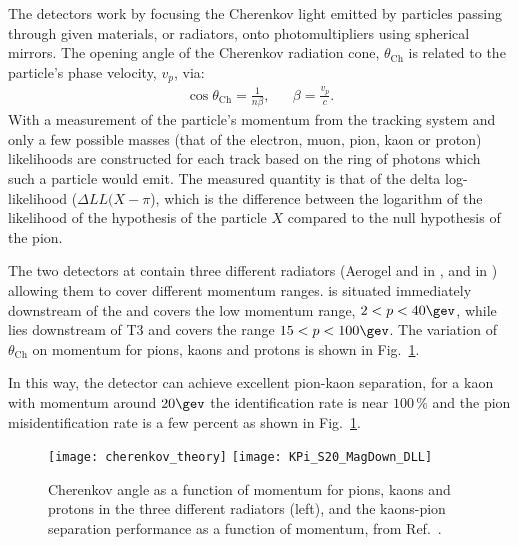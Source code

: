 The \rich detectors work by focusing the Cherenkov light emitted by particles passing through
given materials, or radiators, onto photomultipliers using spherical mirrors.
The opening angle of the Cherenkov radiation cone, $\theta_\mathrm{Ch}$ is related to the
particle's phase velocity, $v_p$, via:
\begin{align}
  \cos\theta_\mathrm{Ch}=\frac1{n\beta}, && \beta=\frac{v_p}{c}.
\end{align}
With a measurement of the particle's momentum from the tracking system and only a few possible
masses (that of the electron, muon, pion, kaon or proton) likelihoods are constructed for each
track based on the ring of photons which such a particle would emit.
The measured quantity is that of the delta log-likelihood ($\Delta LL(X-\pi$), which is the difference between the
logarithm of the likelihood of the hypothesis of the particle $X$ compared to the null hypothesis of the
pion.

The two \rich detectors at \lhcb contain three different radiators (Aerogel and \cfourften in
\richone, and \cffour in \richtwo) allowing them to cover different momentum ranges.
\richone is situated immediately downstream of the \velo and covers the low momentum range,
$2<p<40\gev$, while \richtwo lies downstream of T3 and covers the range $15<p<100\gev$.
The variation of $\theta_\mathrm{Ch}$ on momentum for pions, kaons and protons is shown in
Fig.~\ref{fig:lhcb:pideff}.

In this way, the \lhcb detector can achieve excellent pion-kaon separation, for a kaon with
momentum around $20\gev$ the identification rate is near $100\,\%$ and the pion misidentification
rate is a few percent as shown in Fig.~\ref{fig:lhcb:pideff}.

\begin{figure}
  \begin{center}
    \texttt{[image: cherenkov\_theory]}
    \texttt{[image: KPi\_S20\_MagDown\_DLL]}
  \end{center}
  \caption[Particle identification and Cherenkov angles]
  {\small
    Cherenkov angle as a function of momentum for pions, kaons and protons in the three different
    radiators (left), and the kaons-pion separation performance as a function of momentum, from
    Ref.~\cite{LHCb-DP-2012-003}.
  }
  \label{fig:lhcb:pideff}
\end{figure}

